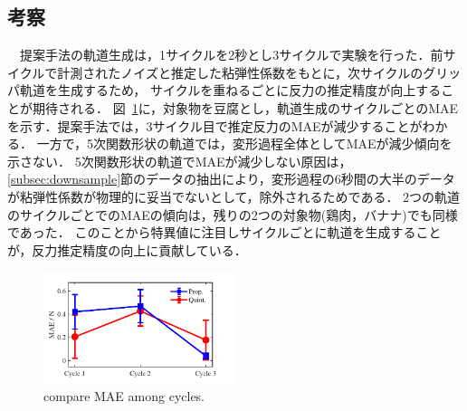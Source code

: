 \documentclass[a4paper]{jarticle}
\begin{document}
\subsection{考察}
　提案手法の軌道生成は，1サイクルを2秒とし3サイクルで実験を行った．前サイクルで計測されたノイズと推定した粘弾性係数をもとに，次サイクルのグリッパ軌道を生成するため，
サイクルを重ねるごとに反力の推定精度が向上することが期待される．
図~\ref{fig:compare_cycle_MAE}に，対象物を豆腐とし，軌道生成のサイクルごとのMAEを示す．提案手法では，3サイクル目で推定反力のMAEが減少することがわかる．
一方で，5次関数形状の軌道では，変形過程全体としてMAEが減少傾向を示さない．
5次関数形状の軌道でMAEが減少しない原因は，\ref{subsec:downsample}節のデータの抽出により，変形過程の6秒間の大半のデータが粘弾性係数が物理的に妥当でないとして，除外されるためである．
2つの軌道のサイクルごとでのMAEの傾向は，残りの2つの対象物(鶏肉，バナナ)でも同様であった．
このことから特異値に注目しサイクルごとに軌道を生成することが，反力推定精度の向上に貢献している．
\begin{figure}[t]
    \centering
    \includegraphics[width=0.5\textwidth]{chikencompare_cycle_MAE.pdf}
    \caption{compare MAE among cycles.}
    \label{fig:compare_cycle_MAE}
\end{figure}
\end{document}
